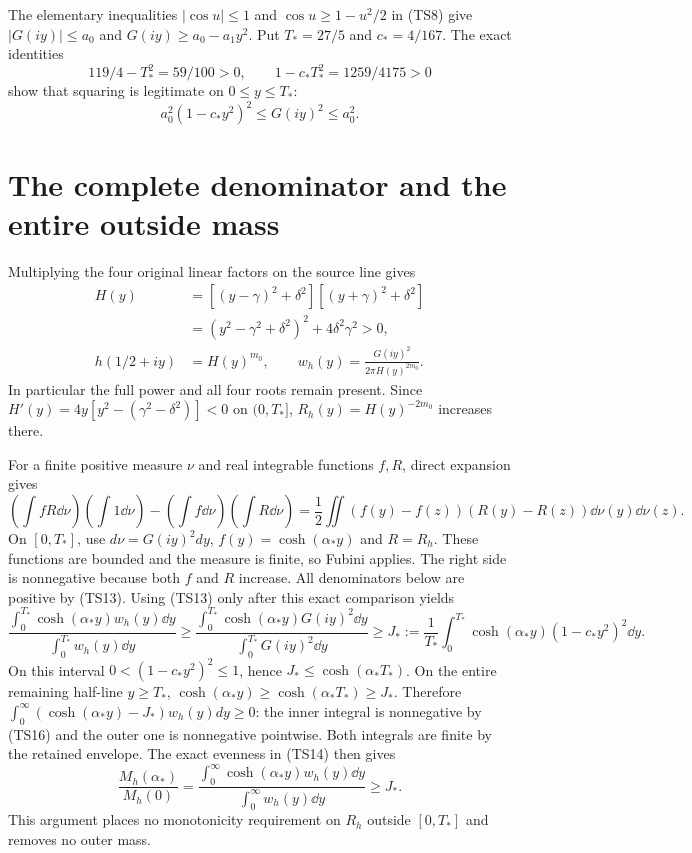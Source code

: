 The elementary inequalities $|\cos u|\leq1$ and
$\cos u\geq1-u^2/2$ in (TS8) give
$|G(iy)|\leq a_0$ and $G(iy)\geq a_0-a_1y^2$.
Put $T_*=27/5$ and $c_*=4/167$. The exact identities
\[
 119/4-T_*^2=59/100>0,\qquad
 1-c_*T_*^2=1259/4175>0
\]
show that squaring is legitimate on $0\leq y\leq T_*$:
\begin{equation}\tag{TS13}
 a_0^2(1-c_*y^2)^2\leq G(iy)^2\leq a_0^2.
\end{equation}

\section{The complete denominator and the entire outside mass}
Multiplying the four original linear factors on the source line gives
\begin{equation}\tag{TS14}\begin{aligned}
 H(y)&=[(y-\gamma)^2+\delta^2][(y+\gamma)^2+\delta^2]\\
 &=(y^2-\gamma^2+\delta^2)^2+4\delta^2\gamma^2>0,\\
 h(1/2+iy)&=H(y)^{m_0},\qquad
 w_h(y)=\frac{G(iy)^2}{2\pi H(y)^{2m_0}}.
\end{aligned}\end{equation}
In particular the full power and all four roots remain present.
Since $H'(y)=4y[y^2-(\gamma^2-\delta^2)]<0$ on $(0,T_*]$,
$R_h(y)=H(y)^{-2m_0}$ increases there.

For a finite positive measure $\nu$ and real integrable functions
$f,R$, direct expansion gives
\begin{equation}\tag{TS15}
 \left(\int fR\dd\nu\right)\left(\int1\dd\nu\right)
 -\left(\int f\dd\nu\right)\left(\int R\dd\nu\right)
 =\frac12\iint(f(y)-f(z))(R(y)-R(z))\dd\nu(y)\dd\nu(z).
\end{equation}
On $[0,T_*]$, use $d\nu=G(iy)^2dy$, $f(y)=\cosh(\alpha_*y)$
and $R=R_h$. These functions are bounded and the measure is finite,
so Fubini applies. The right side is nonnegative because both
$f$ and $R$ increase. All denominators below are positive by (TS13).
Using (TS13) only after this exact comparison yields
\begin{equation}\tag{TS16}
 \frac{\int_0^{T_*}\cosh(\alpha_*y)w_h(y)\dd y}
      {\int_0^{T_*}w_h(y)\dd y}
 \geq\frac{\int_0^{T_*}\cosh(\alpha_*y)G(iy)^2\dd y}
              {\int_0^{T_*}G(iy)^2\dd y}
 \geq J_*:=\frac1{T_*}\int_0^{T_*}\cosh(\alpha_*y)(1-c_*y^2)^2\dd y.
\end{equation}
On this interval $0<(1-c_*y^2)^2\leq1$, hence
$J_*\leq\cosh(\alpha_*T_*)$. On the entire remaining half-line
$y\geq T_*$, $\cosh(\alpha_*y)\geq\cosh(\alpha_*T_*)\geq J_*$.
Therefore
$\int_0^\infty(\cosh(\alpha_*y)-J_*)w_h(y)dy\geq0$:
the inner integral is nonnegative by (TS16) and the outer one
is nonnegative pointwise. Both integrals are finite by the retained
envelope. The exact evenness in (TS14) then gives
\begin{equation}\tag{TS17}
 \frac{M_h(\alpha_*)}{M_h(0)}
 =\frac{\int_0^\infty\cosh(\alpha_*y)w_h(y)\dd y}
        {\int_0^\infty w_h(y)\dd y}\geq J_*.
\end{equation}
This argument places no monotonicity requirement on $R_h$ outside
$[0,T_*]$ and removes no outer mass.

